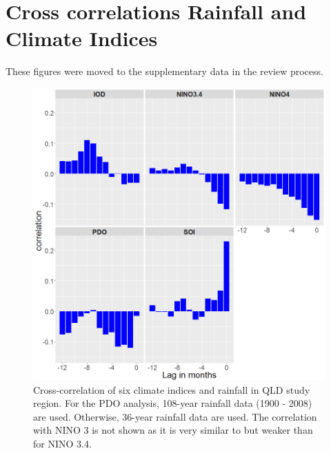 \documentclass[fleqn,10pt,lineno]{wlpeerj} %
\theoremstyle{definition}
\theoremstyle{definition}
\theoremstyle{definition}
\theoremstyle{remark}
\begin{document}
\newpage

\section{Cross correlations Rainfall and Climate
Indices}\label{cross-correlations-rainfall-and-climate-indices}

These figures were moved to the supplementary data in the review
process.

\begin{figure}
\includegraphics[width=0.9\linewidth]{figures/cor_qld} \caption{Cross-correlation of six climate indices and rainfall in QLD study region. For the PDO analysis, 108-year rainfall data (1900 - 2008) are used. Otherwise, 36-year rainfall data are used. The correlation with NINO 3 is not shown as it is very similar to but weaker than for NINO 3.4.}\label{fig:cor-rain-qld}
\end{figure}
\end{document}
